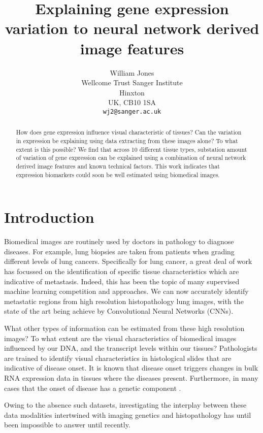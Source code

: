 \documentclass{article}
\title{Explaining gene expression variation to neural network derived image features}
\author{
  William Jones\\
  Wellcome Trust Sanger Institute\\
  Hinxton\\
  UK, CB10 1SA \\
  \texttt{wj2@sanger.ac.uk} \\
}
\begin{document}

\maketitle

\begin{abstract}
How does gene expression influence visual characteristic of tissues? Can the variation in expression be explaining using data extracting from these images alone? To what extent is this possible? We find that across 10 different tissue types, substation amount of variation of gene expression can be explained using a combination of neural network derived image features and known technical factors. This work indicates that expression biomarkers could soon be well estimated using biomedical images. \end{abstract}

\section{Introduction}
Biomedical images are routinely used by doctors in pathology to diagnose diseases. For example, lung biopsies are taken from patients when grading different levels of lung cancers. Specifically for lung cancer, a great deal of work has focussed on the identification of specific tissue characteristics which are indicative of metastasis. Indeed, this has been the topic of many supervised machine learning competition and approaches. We can now accurately identify metastatic regions from high resolution histopathology lung images, with the state of the art being achieve by Convolutional Neural Networks (CNNs).

What other types of information can be estimated from these high resolution images? To what extent are the visual characteristics of biomedical images influenced by our DNA, and the transcript levels within our tissues? Pathologists are trained to identify visual characteristics in histological slides that are indicative of disease onset. It is known that disease onset triggers changes in bulk RNA expression data in tissues where the diseases present. \cite{gene-expression-parkinsons} Furthermore, in many cases that the onset of disease has a genetic component \cite{what-is-complex-about-complex-disorders}. 

Owing to the absence such datasets, investigating the interplay between these data modalities intertwined with imaging genetics and histopathology has until been impossible to answer until recently.
 
\end{document}
